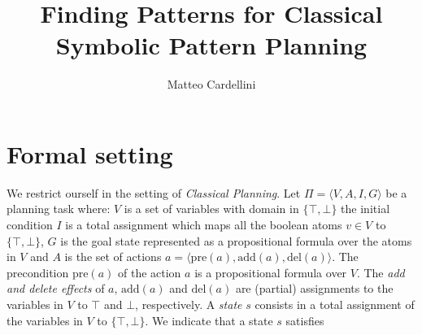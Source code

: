 \documentclass[11pt]{scrartcl}
\newcommand{\tuple}[1]{\langle #1 \rangle}
\newcommand{\set}[1]{\{ #1 \}}
\newcommand{\op}[1]{\mathrm{#1}}
\begin{document}
\title{Finding Patterns for Classical Symbolic Pattern Planning}
\author{Matteo Cardellini}
\maketitle

\section{Formal setting}
We restrict ourself in the setting of \emph{Classical Planning}. Let $\Pi = \tuple{V,A,I,G}$ be a planning task where: $V$ is a set of variables with domain in $\set{\top, \bot}$ the initial condition $I$ is a total assignment which maps all the boolean atoms $v \in V$ to $\set{\top, \bot}$, $G$ is the goal state represented as a propositional formula over the atoms in $V$ and $A$ is the set of actions $a = \tuple{\op{pre}(a), \op{add}(a), \op{del}(a)}$. The precondition $\op{pre}(a)$ of the action $a$ is a propositional formula over $V$. The \emph{add and delete effects} of $a$, $\op{add}(a)$ and $\op{del}(a)$ are (partial) assignments to the variables in $V$ to $\top$ and $\bot$, respectively. A \emph{state} $s$ consists in a total assignment of the variables in $V$ to $\set{\top, \bot}$. We indicate that a state $s$ satisfies 
\end{document}
